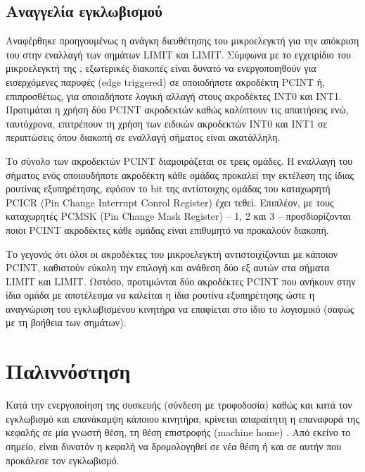 \subsection{Αναγγελία εγκλωβισμού}
\label{subsec:motor:limit-pin-change}

Αναφέρθηκε προηγουμένως η ανάγκη διευθέτησης του μικροελεγκτή για την απόκριση
του στην εναλλαγή των σημάτων LIMIT και LIMIT. Σύμφωνα με το
εγχειρίδιο του μικροελεγκτή της \textcite[71]{atmel13}, εξωτερικές διακοπές
είναι δυνατό να ενεργοποιηθούν για εισερχόμενες παρυφές (\textenglish{edge
triggered}) σε οποιοδήποτε ακροδέκτη PCINT ή, επιπροσθέτως, για οποιαδήποτε
λογική αλλαγή στους ακροδέκτες INT0 και INT1. Προτιμάται η χρήση δύο PCINT
ακροδεκτών καθώς καλύπτουν τις απαιτήσεις ενώ, ταυτόχρονα, επιτρέπουν τη χρήση
των ειδικών ακροδεκτών INT0 και INT1 σε περιπτώσεις όπου διακοπή σε εναλλαγή
σήματος είναι ακατάλληλη.

Το σύνολο των ακροδεκτών PCINT διαμοιράζεται σε τρεις ομάδες. Η εναλλαγή του
σήματος ενός οποιουδήποτε ακροδέκτη κάθε ομάδας προκαλεί την εκτέλεση της ίδιας
ρουτίνας εξυπηρέτησης, εφόσον το bit της αντίστοιχης ομάδας του καταχωρητή PCICR
(\textenglish{Pin Change Interrupt Conrol Register}) έχει τεθεί. Επιπλέον, με
τους καταχωρητές PCMSK (\textenglish{Pin Change Mask Register}) -- 1, 2 και 3 --
προσδιορίζονται ποιοι PCINT ακροδέκτες κάθε ομάδας είναι επιθυμητό να προκαλούν
διακοπή.

Το γεγονός ότι όλοι οι ακροδέκτες του μικροελεγκτή αντιστοιχίζονται με κάποιον
PCINT, καθιστούν εύκολη την επιλογή και ανάθεση δύο εξ αυτών στα σήματα
LIMIT και LIMIT. Ωστόσο, προτιμώνται δύο ακροδέκτες PCINT που
ανήκουν στην ίδια ομάδα με αποτέλεσμα να καλείται η ίδια ρουτίνα εξυπηρέτησης
ώστε η αναγνώριση του εγκλωβισμένου κινητήρα να επαφίεται στο ίδιο το λογισμικό
(σαφώς με τη βοήθεια των σημάτων).

\section{Παλιννόστηση}
\label{sec:motor:homing}

Κατά την ενεργοποίηση της συσκευής (σύνδεση με τροφοδοσία) καθώς και κατά τον
εγκλωβισμό και επανάκαμψη κάποιου κινητήρα, κρίνεται απαραίτητη η επαναφορά της
κεφαλής σε μία γνωστή θέση, τη θέση επιστροφής (\textenglish{machine home})
\parencite[99]{albert11}. Από εκείνο το σημείο, είναι δυνατόν η κεφαλή να
δρομολογηθεί σε νέα θέση ή και σε αυτήν που προκάλεσε τον εγκλωβισμό.

